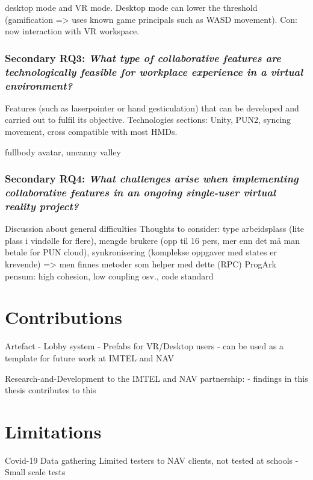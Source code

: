 desktop mode and VR mode. Desktop mode can lower the threshold (gamification => uses known game principals such as WASD movement). Con: now interaction with VR workspace.



\subsubsection{Secondary RQ3: \textit{What type of collaborative features are technologically feasible for workplace experience in a virtual environment?}} 


Features (such as laserpointer or hand gesticulation) that can be developed and carried out to fulfil its objective.
Technologies sections: Unity, PUN2, syncing movement, cross compatible with most HMDs.  

fullbody avatar, uncanny valley 



\subsubsection{Secondary RQ4: \textit{What challenges arise when implementing collaborative features in an ongoing
single-user virtual reality project?}} 

Discussion about general difficulties
Thoughts to consider: type arbeidsplass (lite plass i vindølle for flere), mengde brukere (opp til 16 pers, mer enn det må man betale for PUN cloud), synkronisering (komplekse oppgaver med states er krevende) => men finnes metoder som helper med dette (RPC)
ProgArk pensum: high cohesion, low coupling osv., code standard


\section{Contributions}

Artefact
- Lobby system
- Prefabs for VR/Desktop users
- can be used as a template for future work at IMTEL and NAV

Research-and-Development to the IMTEL and NAV partnership:
- findings in this thesis contributes to this


\section{Limitations}
Covid-19
Data gathering
Limited testers to NAV clients, not tested at schools
- Small scale tests





